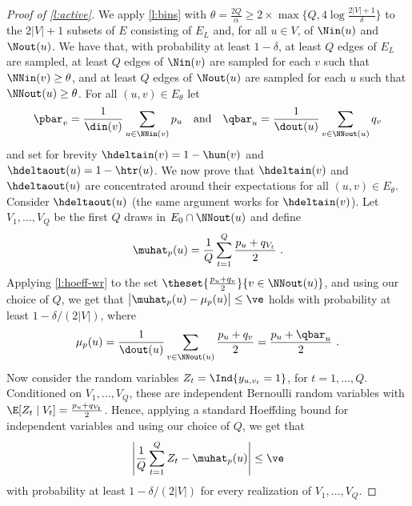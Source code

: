\begin{proof}[Proof of \autoref{l:active}]
We apply \autoref{l:bins} with $\theta = \tfrac{2Q}{\alpha} \ge 2\times\max\big\{Q,4\log
\frac{2|V|+1}{\delta}\big\}$ to the $2|V|+1$ subsets of $E$ consisting of $E_L$ and, for all $u \in
V$, of $\Nin(u)$ and $\Nout(u)$. We have that, with probability at least $1-\delta$, at least $Q$
edges of $E_L$ are sampled, at least $Q$ edges of $\Nin(v)$ are sampled for each $v$ such that
$\NNin(v) \ge \theta$, and at least $Q$ edges of $\Nout(u)$ are sampled for each $u$ such that
$\NNout(u) \ge \theta$.
For all $(u,v) \in E_{\theta}$ let
\[
  \pbar_v = \frac{1}{\din(v)}\sum_{u\in\NNin(v)} p_u \quad\text{and}\quad
  \qbar_u = \frac{1}{\dout(u)}\sum_{v\in\NNout(u)} q_v
\]
and set for brevity $\hdeltain(v) = 1-\hun(v)$ and $\hdeltaout(u) = 1-\htr(u)$.
We now prove that $\hdeltain(v)$ and $\hdeltaout(u)$ are concentrated around their expectations for
all $(u,v) \in E_{\theta}$. Consider $\hdeltaout(u)$ (the same argument works for $\hdeltain(v)$).
Let $V_1,\dots,V_Q$ be the first $Q$ draws in $E_0 \cap \NNout(u)$ and define
\[
  \muhat_p(u) = \frac{1}{Q} \sum_{t=1}^Q \frac{p_u+q_{V_t}}{2}~.
\]
Applying \autoref{l:hoeff-wr} to the set $\theset{\tfrac{p_u+q_v}{2}}{v \in \NNout(u)}$, and using
our choice of $Q$, we get that $\big|\muhat_p(u) - \mu_p(u)\big| \le \ve$ holds with probability at
least $1-\delta/(2|V|)$, where
\[
  \mu_p(u) = \frac{1}{\dout(u)}\sum_{v \in \NNout(u)} \frac{p_u + q_v}{2} = \frac{p_u + \qbar_u}{2}~.
\]
Now consider the random variables $Z_t = \Ind{y_{u,v_t}=1}$, for $t=1,\dots,Q$. Conditioned on
$V_1,\dots,V_Q$, these are independent Bernoulli random variables with $\E[Z_t \mid V_t] =
\tfrac{p_u+q_{V_t}}{2}$. Hence, applying a standard Hoeffding bound for independent variables and
using our choice of $Q$, we get that
\[
  \left|\frac{1}{Q}\sum_{t=1}^Q Z_t - \muhat_p(u) \right| \le \ve 
\]
with probability at least $1-\delta/(2|V|)$ for every realization of $V_1,\dots,V_Q$. 


\end{proof}
